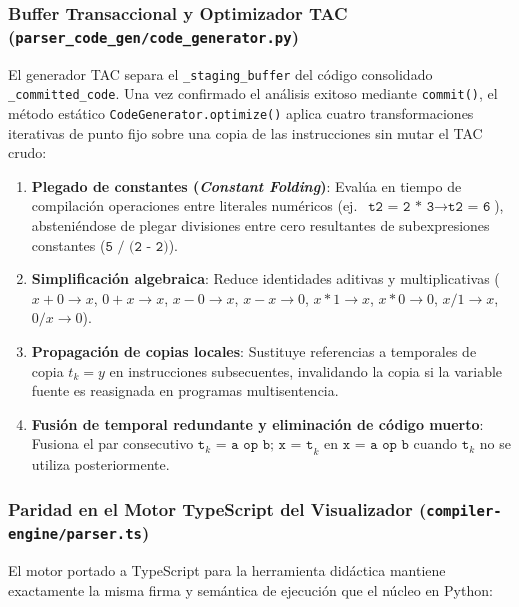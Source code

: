 \documentclass[11pt, letterpaper]{article}
\begin{document}
\subsubsection{Buffer Transaccional y Optimizador TAC (\texttt{parser\_code\_gen/code\_generator.py})}
El generador TAC separa el \texttt{\_staging\_buffer} del código consolidado \texttt{\_committed\_code}. Una vez confirmado el análisis exitoso mediante \texttt{commit()}, el método estático \texttt{CodeGenerator.optimize()} aplica cuatro transformaciones iterativas de punto fijo sobre una copia de las instrucciones sin mutar el TAC crudo:
\begin{enumerate}[leftmargin=1.8em]
    \item \textbf{Plegado de constantes (\textit{Constant Folding})}: Evalúa en tiempo de compilación operaciones entre literales numéricos (ej.\ $\texttt{t2 = 2 * 3} \rightarrow \texttt{t2 = 6}$), absteniéndose de plegar divisiones entre cero resultantes de subexpresiones constantes ($\texttt{5 / (2 - 2)}$).
    \item \textbf{Simplificación algebraica}: Reduce identidades aditivas y multiplicativas ($x + 0 \rightarrow x$, $0 + x \rightarrow x$, $x - 0 \rightarrow x$, $x - x \rightarrow 0$, $x * 1 \rightarrow x$, $x * 0 \rightarrow 0$, $x / 1 \rightarrow x$, $0 / x \rightarrow 0$).
    \item \textbf{Propagación de copias locales}: Sustituye referencias a temporales de copia $t_k = y$ en instrucciones subsecuentes, invalidando la copia si la variable fuente es reasignada en programas multisentencia.
    \item \textbf{Fusión de temporal redundante y eliminación de código muerto}: Fusiona el par consecutivo $\texttt{t}_k\texttt{ = a op b; x = t}_k$ en $\texttt{x = a op b}$ cuando $\texttt{t}_k$ no se utiliza posteriormente.
\end{enumerate}

\subsubsection{Paridad en el Motor TypeScript del Visualizador (\texttt{compiler-engine/parser.ts})}
El motor portado a TypeScript para la herramienta didáctica mantiene exactamente la misma firma y semántica de ejecución que el núcleo en Python:
\end{document}
